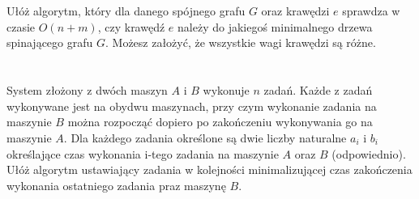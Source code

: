 \documentclass[svgnames]{report}
\begin{document}
\section{}
\begin{framed}
Ułóż algorytm, który dla danego spójnego grafu $G$ oraz krawędzi $e$ sprawdza w czasie $O(n + m)$, czy krawędź $e$ należy do jakiegoś minimalnego drzewa spinającego grafu $G$. Możesz założyć, że wszystkie wagi krawędzi są różne.
\end{framed}

\section{}
\begin{framed}
System złożony z dwóch maszyn $A$ i $B$ wykonuje $n$ zadań. Każde z zadań wykonywane jest na obydwu maszynach, przy czym wykonanie zadania na maszynie $B$ można rozpocząć dopiero po zakończeniu wykonywania go na maszynie $A$. Dla każdego zadania określone są dwie liczby naturalne $a_i$ i $b_i$ określające czas wykonania i-tego zadania na maszynie $A$ oraz $B$ (odpowiednio). Ułóż algorytm ustawiający zadania w kolejności minimalizującej czas zakończenia wykonania ostatniego zadania praz maszynę $B$.
\end{framed}
\end{document}
